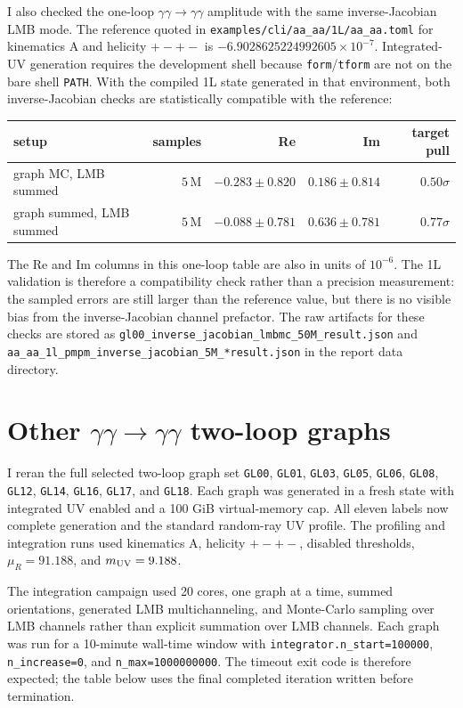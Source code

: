 \documentclass[11pt]{article}
\begin{document}
I also checked the one-loop \(\gamma\gamma\to\gamma\gamma\) amplitude with the
same inverse-Jacobian LMB mode.  The reference quoted in
\texttt{examples/cli/aa\_aa/1L/aa\_aa.toml} for kinematics A and helicity
$+ - + -$ is
\(-6.9028625224992605\times10^{-7}\).  Integrated-UV generation requires the
development shell because \texttt{form}/\texttt{tform} are not on the bare
shell \texttt{PATH}.  With the compiled 1L state generated in that environment,
both inverse-Jacobian checks are statistically compatible with the reference:
\begin{center}
\scriptsize
\begin{tabular}{lrrrr}
\toprule
setup & samples & Re & Im & target pull\\
\midrule
graph MC, LMB summed & $5\,\mathrm{M}$ &
$-0.283\pm0.820$ & $0.186\pm0.814$ & $0.50\sigma$\\
graph summed, LMB summed & $5\,\mathrm{M}$ &
$-0.088\pm0.781$ & $0.636\pm0.781$ & $0.77\sigma$\\
\bottomrule
\end{tabular}
\end{center}
The Re and Im columns in this one-loop table are also in units of $10^{-6}$.
The 1L validation is therefore a compatibility check rather than a precision
measurement: the sampled errors are still larger than the reference value, but
there is no visible bias from the inverse-Jacobian channel prefactor.  The raw
artifacts for these checks are stored as
\texttt{gl00\_inverse\_jacobian\_lmbmc\_50M\_result.json} and
\texttt{aa\_aa\_1l\_pmpm\_inverse\_jacobian\_5M\_*result.json} in the report
data directory.

\section{Other \texorpdfstring{$\gamma\gamma\to\gamma\gamma$}{aa to aa} two-loop graphs}

I reran the full selected two-loop graph set
\texttt{GL00}, \texttt{GL01}, \texttt{GL03}, \texttt{GL05}, \texttt{GL06},
\texttt{GL08}, \texttt{GL12}, \texttt{GL14}, \texttt{GL16}, \texttt{GL17},
and \texttt{GL18}.  Each graph was generated in a fresh state with integrated
UV enabled and a 100 GiB virtual-memory cap.  All eleven labels now complete
generation and the standard random-ray UV profile.  The profiling and
integration runs used kinematics A, helicity $+-+-$, disabled thresholds,
$\mu_R=91.188$, and $m_{\rm UV}=9.188$.

The integration campaign used 20 cores, one graph at a time, summed
orientations, generated LMB multichanneling, and Monte-Carlo sampling over LMB
channels rather than explicit summation over LMB channels.  Each graph was run
for a 10-minute wall-time window with
\texttt{integrator.n\_start=100000}, \texttt{n\_increase=0}, and
\texttt{n\_max=1000000000}.  The timeout exit code is therefore expected; the
table below uses the final completed iteration written before termination.
\end{document}
